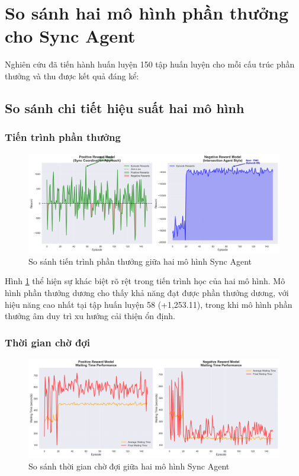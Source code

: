 \section{So sánh hai mô hình phần thưởng cho Sync Agent}

Nghiên cứu đã tiến hành huấn luyện 150 tập huấn luyện cho mỗi cấu trúc phần thưởng và thu được kết quả đáng kể:

\subsection{So sánh chi tiết hiệu suất hai mô hình}

\subsubsection{Tiến trình phần thưởng}

\begin{figure}[!htp]
    \centering
    \includegraphics[width=\textwidth]{figures/sync_reward_comparison.png}
    \caption{So sánh tiến trình phần thưởng giữa hai mô hình Sync Agent}
    \label{fig:sync_reward_comparison}
\end{figure}

Hình \ref{fig:sync_reward_comparison} thể hiện sự khác biệt rõ rệt trong tiến trình học của hai mô hình. Mô hình phần thưởng dương cho thấy khả năng đạt được phần thưởng dương, với hiệu năng cao nhất tại tập huấn luyện 58 (+1,253.11), trong khi mô hình phần thưởng âm duy trì xu hướng cải thiện ổn định.

\subsubsection{Thời gian chờ đợi}

\begin{figure}[!htp]
    \centering
    \includegraphics[width=\textwidth]{figures/sync_waiting_time_comparison.png}
    \caption{So sánh thời gian chờ đợi giữa hai mô hình Sync Agent}
    \label{fig:sync_waiting_time_comparison}
\end{figure}

